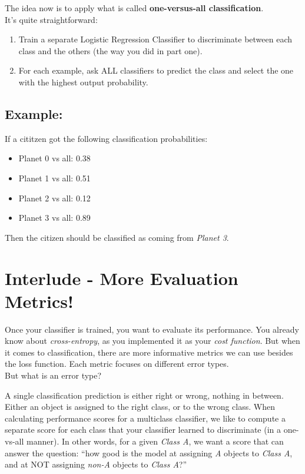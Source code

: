 \documentclass[]{article}
\begin{document}
The idea now is to apply what is called \textbf{one-versus-all
classification}.\\
It's quite straightforward:

\begin{enumerate}
\def\labelenumi{\arabic{enumi})}
\item
  Train a separate Logistic Regression Classifier to discriminate
  between each class and the others (the way you did in part one).
\item
  For each example, ask ALL classifiers to predict the class and select
  the one with the highest output probability.
\end{enumerate}

\hypertarget{example}{%
\subsection{Example:}\label{example}}

If a cititzen got the following classification probabilities:

\begin{itemize}
\item
  Planet 0 vs all: 0.38
\item
  Planet 1 vs all: 0.51
\item
  Planet 2 vs all: 0.12
\item
  Planet 3 vs all: 0.89
\end{itemize}

Then the citizen should be classified as coming from \emph{Planet 3}.

\clearpage

\hypertarget{interlude---more-evaluation-metrics-1}{%
\section{Interlude - More Evaluation
Metrics!}\label{interlude---more-evaluation-metrics-1}}

Once your classifier is trained, you want to evaluate its performance.
You already know about \emph{cross-entropy}, as you implemented it as
your \emph{cost function}. But when it comes to classification, there
are more informative metrics we can use besides the loss function. Each
metric focuses on different error types.\\
But what is an error type?

A single classification prediction is either right or wrong, nothing in
between. Either an object is assigned to the right class, or to the
wrong class. When calculating performance scores for a multiclass
classifier, we like to compute a separate score for each class that your
classifier learned to discriminate (in a one-vs-all manner). In other
words, for a given \emph{Class A}, we want a score that can answer the
question: ``how good is the model at assigning \emph{A} objects to
\emph{Class A}, and at NOT assigning \emph{non-A} objects to \emph{Class
A}?''
\end{document}
